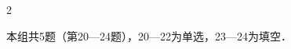 \documentclass[fontset=none]{ctexart}
\begin{document}
\begin{multicols}{2}
\begin{ketang}{本组共5题（第20—24题），20—22为单选，23—24为填空．}
\end{ketang}

\tailfill

\end{multicols}
\end{document}
